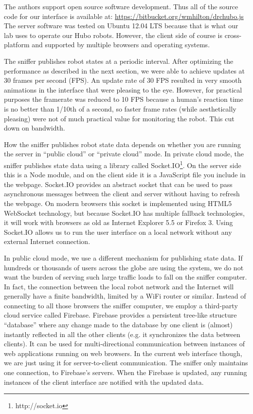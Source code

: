\documentclass[letterpaper, 10 pt, conference]{ieee/ieeeconf}  %
\begin{document}
The authors support open source software development.
Thus all of the source code for our interface is available at: \url{https://bitbucket.org/wmhilton/drchubo.js}
The server software was tested on Ubuntu 12.04 LTS because that is what our lab uses to operate our Hubo robots.
However, the client side of course is cross-platform and supported by multiple browsers and operating systems.

The sniffer publishes robot states at a periodic interval.
After optimizing the performance as described in the next section, we were able to achieve updates at 30 frames per second (FPS).
An update rate of 30 FPS resulted in very smooth animations in the interface that were pleasing to the eye.
However, for practical purposes the framerate was reduced to 10 FPS because a human's reaction time is no better than 1/10th of a second, so faster frame rates (while aesthetically pleasing) were not of much practical value for monitoring the robot. \cite{kosinski2008literature}
This cut down on bandwidth.

How the sniffer publishes robot state data depends on whether you are running the server in ``public cloud'' or ``private cloud'' mode.
In private cloud mode, the sniffer publishes state data using a library called Socket.IO\footnote{http://socket.io}.
On the server side this is a Node module, and on the client side it is a JavaScript file you include in the webpage.
Socket.IO provides an abstract socket that can be used to pass asynchronous messages between the client and server without having to refresh the webpage.
On modern browsers this socket is implemented using HTML5 WebSocket technology, but because Socket.IO has multiple fallback technologies, it will work with browsers as old as Internet Explorer 5.5 or Firefox 3.
Using Socket.IO allows us to run the user interface on a local network without any external Internet connection.

In public cloud mode, we use a different mechanism for publishing state data.
If hundreds or thousands of users across the globe are using the system, we do not want the burden of serving such large traffic loads to fall on the sniffer computer.
In fact, the connection between the local robot network and the Internet will generally have a finite bandwidth, limited by a WiFi router or similar.
Instead of connecting to all those browsers the sniffer computer, we employ a third-party cloud service called Firebase.
Firebase provides a persistent tree-like structure ``database'' where any change made to the database by one client is (almost) instantly reflected in all the other clients (e.g. it synchronizes the data between clients).
It can be used for multi-directional communication between instances of web applications running on web browsers.
In the current web interface though, we are just using it for server-to-client communication.
The sniffer only maintains one connection, to Firebase's servers.
When the Firebase is updated, any running instances of the client interface are notified with the updated data.
\end{document}
